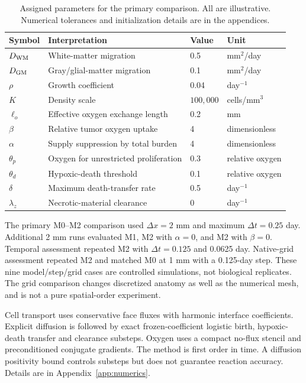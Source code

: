 \begin{table}[tbp]
\centering\small
\caption{Assigned parameters for the primary comparison. All are illustrative. Numerical tolerances and initialization details are in the appendices.}\label{tab:parameters}
\begin{tabularx}{\textwidth}{l Y l l}
\toprule Symbol & Interpretation & Value & Unit\\\midrule
$D_{\rm WM}$ & White-matter migration & 0.5 & mm$^2$/day\\
$D_{\rm GM}$ & Gray/glial-matter migration & 0.1 & mm$^2$/day\\
$\rho$ & Growth coefficient & 0.04 & day$^{-1}$\\
$K$ & Density scale & $100{,}000$ & cells/mm$^3$\\
$\ell_o$ & Effective oxygen exchange length & 0.2 & mm\\
$\beta$ & Relative tumor oxygen uptake & 4 & dimensionless\\
$\alpha$ & Supply suppression by total burden & 4 & dimensionless\\
$\theta_p$ & Oxygen for unrestricted proliferation & 0.3 & relative oxygen\\
$\theta_d$ & Hypoxic-death threshold & 0.1 & relative oxygen\\
$\delta$ & Maximum death-transfer rate & 0.5 & day$^{-1}$\\
$\lambda_z$ & Necrotic-material clearance & 0 & day$^{-1}$\\\bottomrule
\end{tabularx}
\end{table}

The primary M0--M2 comparison used $\Delta x=2$ mm and maximum $\Delta t=0.25$ day. Additional 2 mm runs evaluated M1, M2 with $\alpha=0$, and M2 with $\beta=0$. Temporal assessment repeated M2 with $\Delta t=0.125$ and 0.0625 day. Native-grid assessment repeated M2 and matched M0 at 1 mm with a 0.125-day step. These nine model/step/grid cases are controlled simulations, not biological replicates. The grid comparison changes discretized anatomy as well as the numerical mesh, and is not a pure spatial-order experiment.

Cell transport uses conservative face fluxes with harmonic interface coefficients. Explicit diffusion is followed by exact frozen-coefficient logistic birth, hypoxic-death transfer and clearance substeps. Oxygen uses a compact no-flux stencil and preconditioned conjugate gradients. The method is first order in time. A diffusion positivity bound controls substeps but does not guarantee reaction accuracy. Details are in Appendix~\ref{app:numerics}.

